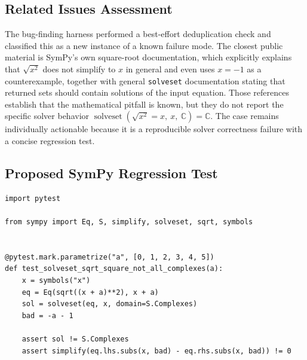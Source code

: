 \documentclass[11pt]{article}
\begin{document}
\subsection{Related Issues Assessment}

The bug-finding harness performed a best-effort deduplication check and classified this as a new instance of a known failure mode. The closest public material is SymPy's own square-root documentation, which explicitly explains that \(\sqrt{x^2}\) does not simplify to \(x\) in general and even uses \(x=-1\) as a counterexample, together with general \texttt{solveset} documentation stating that returned sets should contain solutions of the input equation. Those references establish that the mathematical pitfall is known, but they do not report the specific solver behavior \(\operatorname{solveset}(\sqrt{x^2}=x,\ x,\ \mathbb{C})=\mathbb{C}\). The case remains individually actionable because it is a reproducible solver correctness failure with a concise regression test.

\subsection{Proposed SymPy Regression Test}

\medskip

\begin{lstlisting}[style=bugpython]
import pytest

from sympy import Eq, S, simplify, solveset, sqrt, symbols


@pytest.mark.parametrize("a", [0, 1, 2, 3, 4, 5])
def test_solveset_sqrt_square_not_all_complexes(a):
    x = symbols("x")
    eq = Eq(sqrt((x + a)**2), x + a)
    sol = solveset(eq, x, domain=S.Complexes)
    bad = -a - 1

    assert sol != S.Complexes
    assert simplify(eq.lhs.subs(x, bad) - eq.rhs.subs(x, bad)) != 0
\end{lstlisting}
\end{document}

